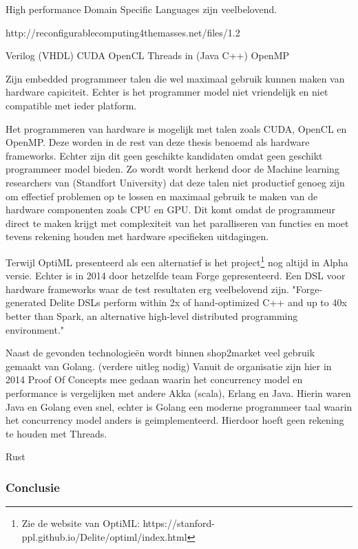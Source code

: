 High performance Domain Specific Languages zijn veelbelovend.

http://reconfigurablecomputing4themasses.net/files/1.2%

Verilog (VHDL)
CUDA
OpenCL
Threads in (Java C++)
OpenMP

Zijn embedded programmeer talen die wel maximaal gebruik kunnen maken van hardware capiciteit. Echter is het programmer model niet vriendelijk en niet compatible met ieder platform.



Het programmeren van hardware is mogelijk met talen zoals CUDA, OpenCL en OpenMP. Deze worden in de rest van deze thesis benoemd als hardware frameworks. Echter zijn dit geen geschikte kandidaten omdat geen geschikt programmeer model bieden. Zo wordt wordt herkend door de Machine learning researchers van (Standfort University) \cite{sujeeth2011optiml} dat deze talen niet productief genoeg zijn om effectief problemen op te lossen en maximaal gebruik te maken van de hardware componenten zoals CPU en GPU. Dit komt omdat de programmeur direct te maken krijgt met complexiteit van het paralliseren van functies en moet tevens rekening houden met hardware specifieken uitdagingen. \parencite{chafi2010language}

Terwijl \cite{sujeeth2011optiml} OptiML presenteerd als een alternatief is het project\footnote{Zie de website van OptiML: https://stanford-ppl.github.io/Delite/optiml/index.html} nog altijd in Alpha versie. Echter is in 2014 door hetzelfde team Forge gepresenteerd. Een DSL voor hardware frameworks waar de test resultaten erg veelbelovend zijn. "Forge-generated Delite DSLs perform within 2x of hand-optimized C++ and up to 40x better than Spark, an alternative high-level distributed programming environment." \parencite{sujeeth2014forge}


Naast de gevonden technologieën wordt binnen shop2market veel gebruik gemaakt van Golang. (verdere uitleg nodig)
Vanuit de organisatie zijn hier in 2014 Proof Of Concepts mee gedaan waarin het concurrency model en performance is vergelijken met andere Akka (scala), Erlang en Java. Hierin waren Java en Golang even snel, echter is Golang een moderne programmeer taal waarin het concurrency model anders is geimplementeerd. Hierdoor hoeft geen rekening te houden met Threads.

Rust

\subsubsection{\textbf{Conclusie}}

